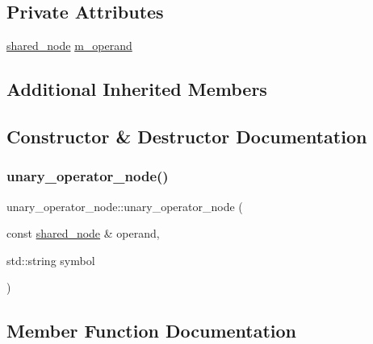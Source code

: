 \subsection*{Private Attributes}
\begin{DoxyCompactItemize}
\item 
\hyperlink{namespacejawe_a3f307481d921b6cbb50cc8511fc2b544}{shared\+\_\+node} \hyperlink{classjawe_1_1unary__operator__node_a693dc1355d40a4a4a2a2efd523e02732}{m\+\_\+operand}
\end{DoxyCompactItemize}
\subsection*{Additional Inherited Members}


\subsection{Constructor \& Destructor Documentation}
\mbox{\label{classjawe_1_1unary__operator__node_a8910c06bbd0a82167972796bcdceba5d}} 
\subsubsection{\texorpdfstring{unary\+\_\+operator\+\_\+node()}{unary\_operator\_node()}}
{\footnotesize\ttfamily unary\+\_\+operator\+\_\+node\+::unary\+\_\+operator\+\_\+node (\begin{DoxyParamCaption}\item[{const \hyperlink{namespacejawe_a3f307481d921b6cbb50cc8511fc2b544}{shared\+\_\+node} \&}]{operand,  }\item[{std\+::string}]{symbol }\end{DoxyParamCaption})}



\subsection{Member Function Documentation}
\mbox{\label{classjawe_1_1unary__operator__node_ab714818721ad242f7e0495f9c12edeb9}} 

